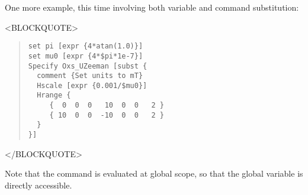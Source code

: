 One more example, this time involving both variable and command
substitution:
\begin{rawhtml}<BLOCKQUOTE>\end{rawhtml}
\begin{quote}
\begin{verbatim}
set pi [expr {4*atan(1.0)}]
set mu0 [expr {4*$pi*1e-7}]
Specify Oxs_UZeeman [subst {
  comment {Set units to mT}
  Hscale [expr {0.001/$mu0}]
  Hrange {
     {  0  0  0   10  0  0   2 }
     { 10  0  0  -10  0  0   2 }
  }
}]
\end{verbatim}
\end{quote}
\begin{rawhtml}</BLOCKQUOTE>\end{rawhtml}
Note that the  command is evaluated at global scope, so that
the global variable  is directly accessible.

